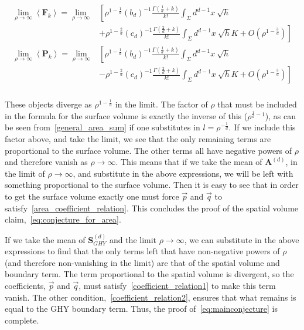 \documentclass[12pt]{article}
\newcommand{\BF}[1]{\mathbf{F}_{#1}}
\newcommand{\BP}[1]{\mathbf{P}_{#1}}
\begin{document}
\begin{gather}\label{eq:nmax_nmin_final}
\begin{aligned}
\lim_{\rho\rightarrow\infty}\left\langle \BF{k}\right\rangle = \lim_{\rho\rightarrow\infty} & \left[ \rho^{1-\frac{1}{d}} \left (b_d\right)^{-1} \frac{\Gamma\left (\frac{1}{d}+k\right)}{k!}
\int_{\Sigma}d^{d-1}x\: \sqrt{h} \right.
 \\
 &  \left. +\rho^{1-\frac{2}{d}} \left (c_d\right)^{-1} \frac{\Gamma\left (\frac{2}{d}+k\right)}{k!}
\int_{\Sigma}d^{d-1}x\: \sqrt{h}K + O\left (\rho^{1-\frac{3}{d}} \right) \right]
\\
\lim_{\rho\rightarrow\infty}\left\langle \BP{k}\right\rangle = \lim_{\rho\rightarrow\infty} & \left[ \rho^{1-\frac{1}{d}} \left (b_d\right)^{-1} \frac{\Gamma\left (\frac{1}{d}+k\right)}{k!}
\int_{\Sigma}d^{d-1}x\: \sqrt{h} \right.
 \\
 &  \left. -\rho^{1-\frac{2}{d}} \left (c_d\right)^{-1} \frac{\Gamma\left (\frac{2}{d}+k\right)}{k!}
\int_{\Sigma}d^{d-1}x\: \sqrt{h}K + O\left (\rho^{1-\frac{3}{d}} \right) \right]
\\
\end{aligned}
\end{gather}

These objects diverge as $\rho^{1-\frac{1}{d}}$ in the limit. The factor of $\rho$ that must be included in the formula for the surface volume is exactly the inverse of this ($\rho^{\frac{1}{d}-1}$), as can be seen from~\eqref{general_area_sum} if one substitutes in $l=\rho^{-\frac{1}{d}}$. If we include this factor above, and take the limit, we see that the only remaining terms are proportional to the surface volume. The other terms all have negative powers of $\rho$ and therefore vanish as $\rho\rightarrow\infty$. This means that if we take the mean of $\textbf{A}^{ (d)}$, in the limit of $\rho\rightarrow\infty$, and substitute in the above expressions, we will be left with something proportional to the surface volume. Then it is easy to see that in order to get the surface volume exactly one must force $\vec{p}$ and $\vec{q}$ to satisfy~\eqref{area_coefficient_relation}. This concludes the proof of the spatial volume claim,~\eqref{eq:conjecture_for_area}. 

If we take the mean of $\textbf{S}^{ (d)}_{GHY}$ and the limit $\rho\rightarrow\infty$, we can substitute in the above expressions to find that the only terms left that have non-negative powers of $\rho$ (and therefore non-vanishing in the limit) are that of the spatial volume and boundary term. The term proportional to the spatial volume is divergent, so the coefficients, $\vec{p}$ and $\vec{q}$, must satisfy~\eqref{coefficient_relation1} to make this term vanish. The other condition,~\eqref{coefficient_relation2}, ensures that what remains is equal to the GHY boundary term. Thus, the proof of~\eqref{eq:mainconjecture} is complete.
\end{document}
